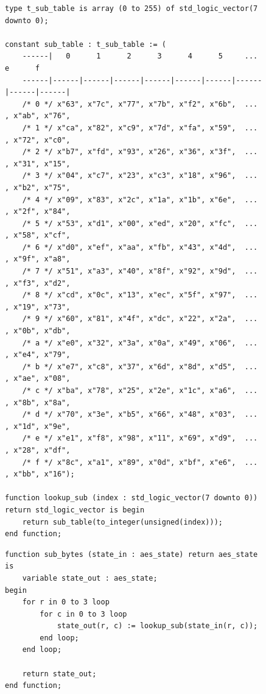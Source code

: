 \begin{figure}[!h]
\begin{lstlisting}[style=vhdl, captionpos=b, caption={Implementacja S-Box}, label={lst:s-box}]
type t_sub_table is array (0 to 255) of std_logic_vector(7 downto 0);

constant sub_table : t_sub_table := (
	------|   0      1      2      3      4      5     ...     e      f
	------|------|------|------|------|------|------|------|------|------|
	/* 0 */ x"63", x"7c", x"77", x"7b", x"f2", x"6b",  ... , x"ab", x"76",
	/* 1 */ x"ca", x"82", x"c9", x"7d", x"fa", x"59",  ... , x"72", x"c0",
	/* 2 */ x"b7", x"fd", x"93", x"26", x"36", x"3f",  ... , x"31", x"15",
	/* 3 */ x"04", x"c7", x"23", x"c3", x"18", x"96",  ... , x"b2", x"75",
	/* 4 */ x"09", x"83", x"2c", x"1a", x"1b", x"6e",  ... , x"2f", x"84",
	/* 5 */ x"53", x"d1", x"00", x"ed", x"20", x"fc",  ... , x"58", x"cf",
	/* 6 */ x"d0", x"ef", x"aa", x"fb", x"43", x"4d",  ... , x"9f", x"a8",
	/* 7 */ x"51", x"a3", x"40", x"8f", x"92", x"9d",  ... , x"f3", x"d2",
	/* 8 */ x"cd", x"0c", x"13", x"ec", x"5f", x"97",  ... , x"19", x"73",
	/* 9 */ x"60", x"81", x"4f", x"dc", x"22", x"2a",  ... , x"0b", x"db",
	/* a */ x"e0", x"32", x"3a", x"0a", x"49", x"06",  ... , x"e4", x"79",
	/* b */ x"e7", x"c8", x"37", x"6d", x"8d", x"d5",  ... , x"ae", x"08",
	/* c */ x"ba", x"78", x"25", x"2e", x"1c", x"a6",  ... , x"8b", x"8a",
	/* d */ x"70", x"3e", x"b5", x"66", x"48", x"03",  ... , x"1d", x"9e",
	/* e */ x"e1", x"f8", x"98", x"11", x"69", x"d9",  ... , x"28", x"df",
	/* f */ x"8c", x"a1", x"89", x"0d", x"bf", x"e6",  ... , x"bb", x"16");

function lookup_sub (index : std_logic_vector(7 downto 0)) 
return std_logic_vector is begin
	return sub_table(to_integer(unsigned(index)));
end function;
\end{lstlisting}
\end{figure}

\begin{figure}[!p]
\begin{lstlisting}[style=vhdl, captionpos=b, caption={Implementacja transformacji stanu SubBytes}, label={lst:sub-bytes}]
function sub_bytes (state_in : aes_state) return aes_state is 
	variable state_out : aes_state;
begin
	for r in 0 to 3 loop
		for c in 0 to 3 loop
			state_out(r, c) := lookup_sub(state_in(r, c));
		end loop;
	end loop;
		
	return state_out;
end function;
\end{lstlisting}
\end{figure}


